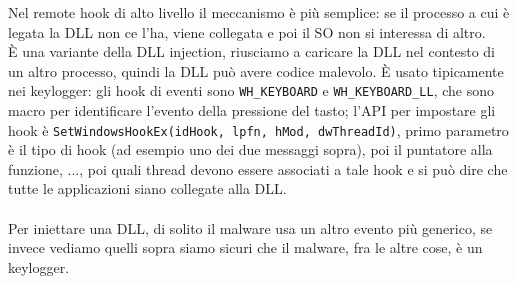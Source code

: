 \documentclass[12pt, oneside]{extbook}
\begin{document}
Nel remote hook di alto livello il meccanismo è più semplice: se il processo a cui è legata la DLL non ce l'ha, viene collegata e poi il SO non si interessa di altro.\\È una variante della DLL injection, riusciamo a caricare la DLL nel contesto di un altro processo, quindi la DLL può avere codice malevolo. È usato tipicamente nei keylogger: gli hook di eventi sono \texttt{WH\_KEYBOARD} e \texttt{WH\_KEYBOARD\_LL}, che sono macro per identificare l'evento della pressione del tasto; l'API per impostare gli hook è \texttt{SetWindowsHookEx(idHook, lpfn, hMod, dwThreadId)}, primo parametro è il tipo di hook (ad esempio uno dei due messaggi sopra), poi il puntatore alla funzione, ..., poi quali thread devono essere associati a tale hook e si può dire che tutte le applicazioni siano collegate alla DLL.\\\\Per iniettare una DLL, di solito il malware usa un altro evento più generico, se invece vediamo quelli sopra siamo sicuri che il malware, fra le altre cose, è un keylogger.
\end{document}
